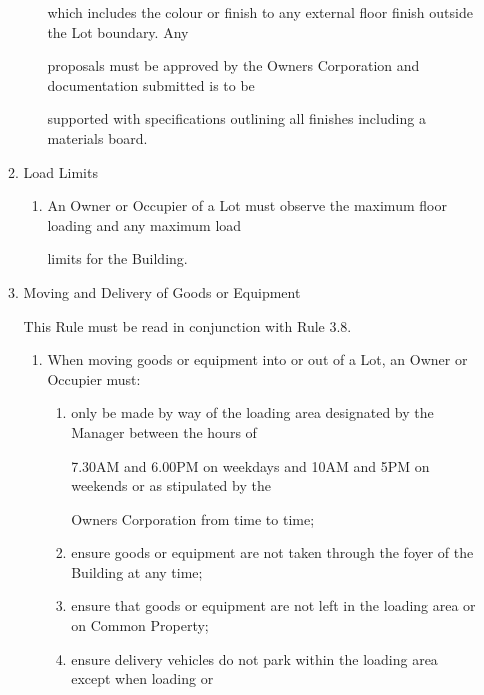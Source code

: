 \documentclass{article}
\begin{document}
\begin{enumerate}[label=\arabic*.]
\begin{enumerate}[label=\arabic{enumi}.\arabic*.]
\begin{enumerate}[label=(\arabic*)]
{\fontsize{10.02}{1}which includes the colour or finish to any external floor finish outside the Lot boundary. Any }

{\fontsize{10.02}{1}proposals must be approved by the Owners Corporation and documentation submitted is to be }

{\fontsize{10.02}{1}supported with specifications outlining all finishes including a materials board. }

\end{enumerate}
\item {\fontsize{9.99}{1} Load Limits }

\begin{enumerate}[label=(\arabic*)]
\item {\fontsize{9.962}{1} An Owner or Occupier of a Lot must observe the maximum floor loading and any maximum load }

{\fontsize{10.02}{1}limits for the Building. }

\newpage

\end{enumerate}
\item {\fontsize{9.99}{1} Moving and Delivery of Goods or Equipment }

{\fontsize{10.02}{1}This Rule must be read in conjunction with Rule 3.8. }

\begin{enumerate}[label=(\arabic*)]
\item {\fontsize{9.962}{1} When moving goods or equipment into or out of a Lot, an Owner or Occupier must: }

\begin{enumerate}[label=(\alph*)]
\item {\fontsize{9.962}{1} only be made by way of the loading area designated by the Manager between the hours of }

{\fontsize{10.02}{1}7.30AM and 6.00PM on weekdays and 10AM and 5PM on weekends or as stipulated by the }

{\fontsize{10.02}{1}Owners Corporation from time to time; }

\item {\fontsize{9.962}{1} ensure goods or equipment are not taken through the foyer of the Building at any time; }

\item {\fontsize{9.962}{1} ensure that goods or equipment are not left in the loading area or on Common Property; }

\item {\fontsize{9.962}{1} ensure delivery vehicles do not park within the loading area except when loading or }


\end{enumerate}
\end{enumerate}
\end{enumerate}
\end{enumerate}
\end{document}
